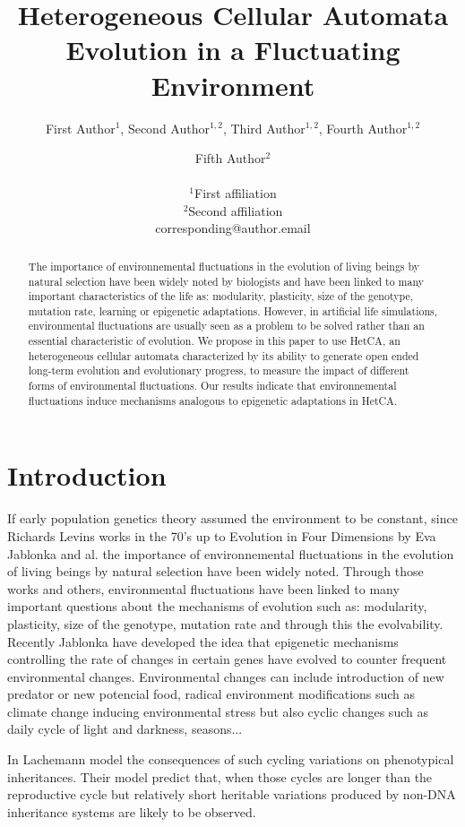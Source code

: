 \documentclass[letterpaper]{article}
\title{Heterogeneous Cellular Automata Evolution in a Fluctuating Environment}
\author{First Author$^{1}$, Second Author$^{1,2}$, Third Author$^{1,2}$, Fourth Author$^{1,2}$ \and Fifth Author$^2$ \\
\mbox{}\\
$^1$First affiliation  \\
$^2$Second affiliation \\
corresponding@author.email}
\begin{document}
\maketitle

\begin{abstract}
The importance of environnemental fluctuations in the evolution of living beings by natural selection have been widely noted by biologists and have been linked to many important characteristics of the life as: modularity, plasticity, size of the genotype, mutation rate, learning or epigenetic adaptations. However, in artificial life simulations, environmental fluctuations are usually seen as a problem to be solved rather than an essential characteristic of evolution. We propose in this paper to use HetCA, an heterogeneous cellular automata characterized by its ability to generate open ended long-term evolution and evolutionary progress, to measure the impact of different forms of environmental fluctuations. Our results indicate that environnemental fluctuations induce mechanisms analogous to epigenetic adaptations in HetCA.
\end{abstract}



\section{Introduction}
If early population genetics theory assumed the environment to be constant, since Richards Levins works \cite{levins1968evolution} in the 70's up to Evolution in Four Dimensions by Eva Jablonka and al. \cite{jablonka2014evolution} the importance of environnemental fluctuations in the evolution of living beings by natural selection have been widely noted. Through those works and others, environmental fluctuations have been linked to many important questions about the mechanisms of evolution such as: modularity, plasticity, size of the genotype, mutation rate and through this the evolvability. Recently Jablonka\cite{jablonka2014evolution} have developed the idea that epigenetic mechanisms controlling the rate of changes in certain genes have evolved to counter frequent environmental changes. 
Environmental changes can include introduction of new predator or new potencial food, radical environment modifications such as climate change inducing environmental stress but also cyclic changes such as daily cycle of light and darkness, seasons...  

In \cite{lachmann1996inheritance} Lachemann model the consequences of such cycling variations on phenotypical inheritances. Their model predict that, when those cycles are longer than the reproductive cycle but relatively short heritable variations produced by non-DNA inheritance systems are likely to be observed.
\end{document}
